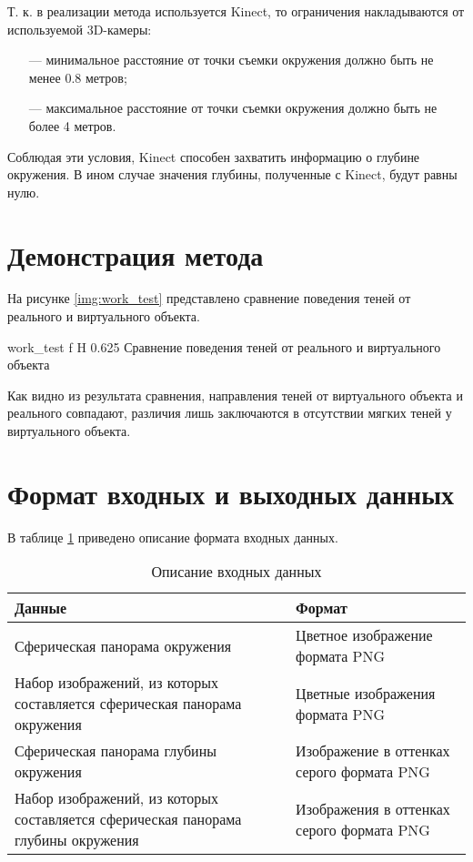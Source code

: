 Т. к. в реализации метода используется Kinect, то ограничения накладываются от используемой 3D-камеры:

\begin{itemize}
	\item[---] минимальное расстояние от точки съемки окружения должно быть не менее 0.8 метров;
	\item[---] максимальное расстояние от точки съемки окружения должно быть не более 4 метров.
\end{itemize}

Соблюдая эти условия, Kinect способен захватить информацию о глубине окружения. В ином случае значения глубины, полученные с Kinect, будут равны нулю.

\section{Демонстрация метода}

На рисунке \ref{img:work_test} представлено сравнение поведения теней от реального и виртуального объекта.

{work_test}
{f}
{H}
{0.625\textwidth}
{Сравнение поведения теней от реального и виртуального объекта}

Как видно из результата сравнения, направления теней от виртуального объекта и реального совпадают, различия лишь заключаются в отсутствии мягких теней у виртуального объекта.

\section{Формат входных и выходных данных}

В таблице \ref{FormatData} приведено описание формата входных данных.

\begin{table}[H]
	\caption{Описание входных данных}
	\label{FormatData}
	\begin{center}
		\begin{tabular}{| p{6 cm} | p{9 cm} |} 
			\hline
			Данные & Формат \\
			\hline
			Сферическая панорама окружения & Цветное изображение формата PNG \\
			\hline
			Набор изображений, из которых составляется сферическая панорама окружения & Цветные изображения формата PNG \\
			\hline
			Сферическая панорама глубины окружения & Изображение в оттенках серого формата PNG \\
			\hline
			Набор изображений, из которых составляется сферическая панорама глубины окружения & Изображения в оттенках серого формата PNG \\
			\hline
		\end{tabular}
	\end{center}
\end{table}

